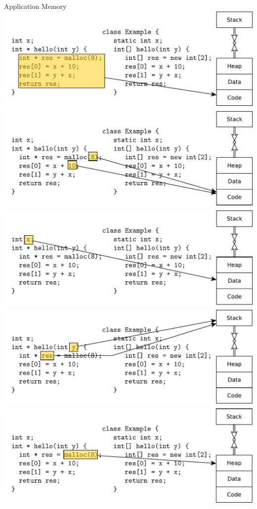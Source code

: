 \documentclass{beamer}
\begin{document}
 \begin{frame}[t]{Application Memory}
\center
{    {
  \includegraphics[width=0.9\linewidth]{code2}
}
     {
  \includegraphics[width=0.9\linewidth]{code3}
}
     {
  \includegraphics[width=0.9\linewidth]{code4}
}
     {
  \includegraphics[width=0.9\linewidth]{code5}
}
     {
  \includegraphics[width=0.9\linewidth]{code6}
}}
\end{frame}
\end{document}
